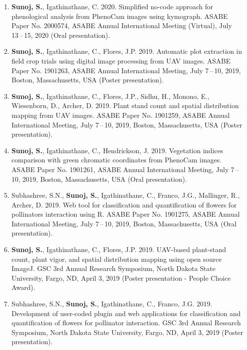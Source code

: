 \documentclass[11pt]{article}
\begin{document}
\begin{enumerate}[itemsep=-2pt]
\item \textbf{Sunoj, S.}, Igathinathane, C. 2020. Simplified no-code approach for phenological analysis from PhenoCam images using kymograph. ASABE Paper No. 2000574, ASABE Annual International Meeting (Virtual), July 13\,--\,15, 2020 (Oral presentation).

\item \textbf{Sunoj, S.}, Igathinathane, C., Flores, J.P. 2019. Automatic plot extraction in field crop trials using digital image processing from UAV images. ASABE Paper No. 1901263, ASABE Annual International Meeting, July 7\,--\,10, 2019, Boston, Massachusetts, USA (Poster presentation).

\item \textbf{Sunoj, S.}, Igathinathane, C., Flores, J.P., Sidhu, H., Monono, E., Wiesenborn, D., Archer, D. 2019. Plant stand count and spatial distribution mapping from UAV images. ASABE Paper No. 1901259, ASABE Annual International Meeting, July 7\,--\,10, 2019, Boston, Massachusetts, USA (Poster presentation).

\item \textbf{Sunoj, S.}, Igathinathane, C., Hendrickson, J. 2019. Vegetation indices comparison with green chromatic coordinates from PhenoCam images. ASABE Paper No. 1901261, ASABE Annual International Meeting, July 7\,--\,10, 2019, Boston, Massachusetts, USA (Oral presentation).

\item Subhashree, S.N., \textbf{Sunoj, S.}, Igathinathane, C., Franco, J.G., Mallinger, R., Archer, D. 2019. Web tool for classification and quantification of flowers for pollinators interaction using R. ASABE Paper No. 1901275, ASABE Annual International Meeting, July 7\,--\,10, 2019, Boston, Massachusetts, USA (Oral presentation).

\item \textbf{Sunoj, S.}, Igathinathane, C., Flores, J.P. 2019. UAV-based plant-stand count, plant vigor, and spatial distribution mapping using open source ImageJ. GSC 3rd Annual Research Symposium, North Dakota State University, Fargo, ND, April 3, 2019 (Poster presentation - People Choice Award).

\item Subhashree, S.N., \textbf{Sunoj, S.}, Igathinathane, C., Franco, J.G. 2019. Development of user-coded plugin and web applications for classification and quantification of flowers for pollinator interaction. GSC 3rd Annual Research Symposium, North Dakota State University, Fargo, ND, April 3, 2019 (Poster presentation).


\end{enumerate}
\end{document}
